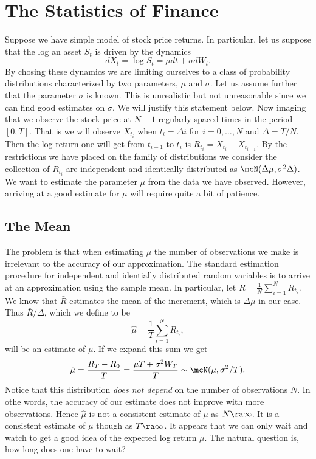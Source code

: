 \documentclass{report}
\begin{document}
\section{The Statistics of Finance}

Suppose we have simple model of stock price returns.  In particular,
let us suppose that the log an asset $S_t$ is driven by the dynamics
\[
d X_t = \log S_t = \mu dt + \sigma dW_t.
\]
By chosing these dynamics we are limiting ourselves to a class of
probability distributions characterized by two parameters, $\mu$ and
$\sigma$.  Let us assume further that the parameter $\sigma$ is known. 
This is unrealistic but not unreasonable since we can find good
estimates on $\sigma$.  We will justify this statement below.  Now
imaging that we observe the stock price at $N+1$ regularly spaced
times in the period $[0,T]$.  That is we will observe $X_{t_i}$ when
$t_i = \Delta i$ for $i = 0, \ldots, N$ and $\Delta = T/N$.  Then the
log return one will get from $t_{i-1}$ to $t_i$ is $R_{t_i} = X_{t_i}
- X_{t_{i-1}}$.  By the restrictions we have placed on the family of
distributions we consider the collection of $R_{t_i}$ are independent
and identically distributed as $\mcN(\Delta \mu, \sigma^2 \Delta)$. 
We want to estimate the parameter $\mu$ from the data we have
observed.  However, arriving at a good estimate for $\mu$ will require
quite a bit of patience.

\subsection{The Mean}

The problem is that when estimating $\mu$ the number of observations
we make is irrelevant to the accuracy of our approximation.  The
standard estimation procedure for independent and identially
distributed random variables is to arrive at an approximation using
the sample mean.  In particular, let
\(
\bar R = \frac{1}{N} \sum_{i=1}^N R_{t_i}.
\)
We know that $\bar R$ estimates the mean of the increment, which is
$\Delta \mu$ in our case.  Thus $\bar R / \Delta$, which we define to
be
\[
\hat \mu = \frac{1}{T}  \sum_{i=1}^N R_{t_i},
\]
will be an estimate of $\mu$.  If we expand this sum we get
\[
\hat \mu = \frac{R_T - R_0}{T} = \frac{\mu T + \sigma^2 W_T}{T} \sim
\mcN(\mu, \sigma^2 / T).
\]
Notice that this distribution \emph{does not depend} on the number of
observations $N$.  In othe words, the accuracy of our estimate does
not improve with more observations.  Hence $\hat \mu$ is not a
consistent estimate of $\mu$ as $N \ra \infty$.  It is a consistent
estimate of $\mu$ though as $T \ra \infty$.  It appears that we can
only wait and watch to get a good idea of the expected log return
$\mu$.  The natural question is, how long does one have to wait?
\end{document}
